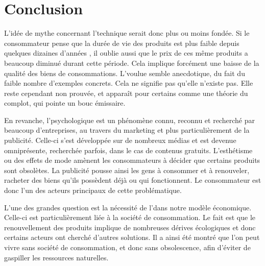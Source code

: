 \chapter*{Conclusion}

%
%
%
%
%

L'idée de mythe concernant l'\op technique serait donc plus ou moins fondée. Si le consommateur pense que la durée de vie des produits est plus faible depuis quelques dizaines d'années , il oublie aussi que le prix de ces même produits a beaucoup diminué durant cette période. Cela implique forcément une baisse de la qualité des biens de consommations. L'\op voulue semble anecdotique, du fait du faible nombre d'exemples concrets. Cela ne signifie pas qu'elle n'existe pas. Elle reste cependant non prouvée, et apparaît pour certains comme une théorie du complot, qui pointe un bouc émissaire. 

En revanche, l'\op psychologique est un phénomène connu, reconnu et recherché par beaucoup d'entreprises, au travers du marketing et plus particulièrement de la publicité. Celle-ci s'est développée sur de nombreux médias et est devenue omniprésente, recherchée parfois, dans le cas de contenus gratuits. L'esthétisme ou des effets de mode amènent les consommateurs à décider que certains produits sont obsolètes. La publicité pousse ainsi les gens à consommer et à renouveler, racheter des biens qu'ils possèdent déjà ou qui fonctionnent. Le consommateur est donc l'un des acteurs principaux de cette problématique.

L'une des grandes question est la nécessité de l'\op dans notre modèle économique. Celle-ci est particulièrement liée à la société de consommation. Le fait est que le renouvellement des produits implique de nombreuses dérives écologiques et donc certains acteurs ont cherché d'autres solutions. Il a ainsi été montré que l'on peut vivre sans société de consommation, et donc sans obsolescence, afin d'éviter de gaspiller les ressources naturelles.